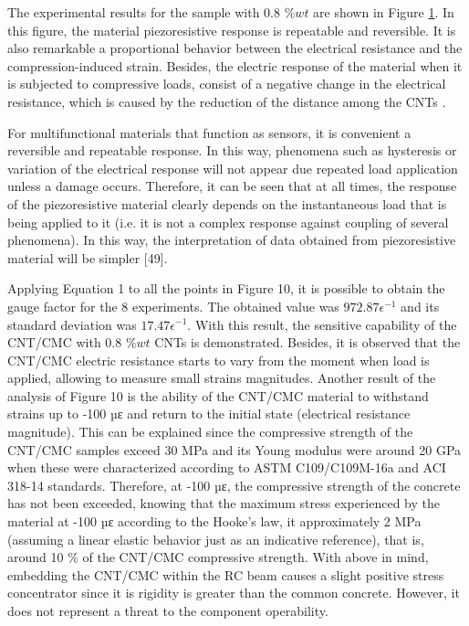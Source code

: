 \documentclass[twocolumn]{bmcart}%
\begin{document}
The experimental results for the sample with 0.8 $\%wt$ are shown in Figure \ref{fig10}. In this figure, the material piezoresistive response is repeatable and reversible. It is also remarkable a proportional behavior between the electrical resistance and the compression-induced strain. Besides, the electric response of the material when it is subjected to compressive loads, consist of a negative change in the electrical resistance, which is caused by the reduction of the distance among the CNTs \cite{DAlessandro2017}.

For multifunctional materials that function as sensors, it is convenient a reversible and repeatable response. In this way, phenomena such as hysteresis or variation of the electrical response will not appear due repeated load application unless a damage occurs.  Therefore, it can be seen that at all times, the response of the piezoresistive material clearly depends on the instantaneous load that is being applied to it (i.e. it is not a complex response against coupling of several phenomena). In this way, the interpretation of data obtained from piezoresistive material will be simpler [49].

\begin{figure}[h!]
  \caption{
      }
      \label{fig10}
      \end{figure}


Applying Equation 1 to all the points in Figure 10, it is possible to obtain the gauge factor for the 8 experiments. The obtained value was $972.87\epsilon^{-1}$ and its standard deviation was $17.47 \epsilon^{-1}$. With this result, the sensitive capability of the CNT/CMC with 0.8 $\%wt$ CNTs is demonstrated. Besides, it is observed that the CNT/CMC electric resistance starts to vary from the moment when load is applied, allowing to measure small strains magnitudes.
Another result of the analysis of Figure 10 is the ability of the CNT/CMC material to withstand strains up to -100 µε and return to the initial state (electrical resistance magnitude). This can be explained since the compressive strength of the CNT/CMC samples exceed 30 MPa and its Young modulus were around 20 GPa when these were characterized according to ASTM C109/C109M-16a and ACI 318-14 standards. Therefore, at -100 µε, the compressive strength of the concrete has not been exceeded, knowing that the maximum stress experienced by the material at -100 µε according to the Hooke’s law, it approximately 2 MPa (assuming a linear elastic behavior just as an indicative reference), that is, around 10 $\%$ of the CNT/CMC compressive strength. 
With above in mind, embedding the CNT/CMC within the RC beam causes a slight positive stress concentrator since it is rigidity is greater than the common concrete. However, it does not represent a threat to the component operability.
\end{document}
